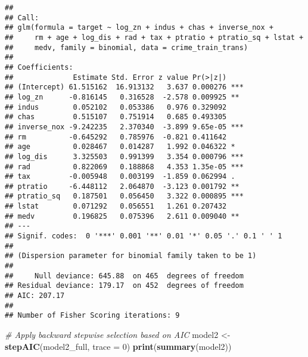 \documentclass[
]{article}
\newenvironment{Shaded}{\begin{snugshade}}{\end{snugshade}}
\newcommand{\AttributeTok}[1]{\textcolor[rgb]{0.13,0.29,0.53}{#1}}
\newcommand{\CommentTok}[1]{\textcolor[rgb]{0.56,0.35,0.01}{\textit{#1}}}
\newcommand{\DecValTok}[1]{\textcolor[rgb]{0.00,0.00,0.81}{#1}}
\newcommand{\FunctionTok}[1]{\textcolor[rgb]{0.13,0.29,0.53}{\textbf{#1}}}
\newcommand{\NormalTok}[1]{#1}
\newcommand{\OtherTok}[1]{\textcolor[rgb]{0.56,0.35,0.01}{#1}}
\begin{document}
\begin{verbatim}
## 
## Call:
## glm(formula = target ~ log_zn + indus + chas + inverse_nox + 
##     rm + age + log_dis + rad + tax + ptratio + ptratio_sq + lstat + 
##     medv, family = binomial, data = crime_train_trans)
## 
## Coefficients:
##              Estimate Std. Error z value Pr(>|z|)    
## (Intercept) 61.515162  16.913132   3.637 0.000276 ***
## log_zn      -0.816145   0.316528  -2.578 0.009925 ** 
## indus        0.052102   0.053386   0.976 0.329092    
## chas         0.515107   0.751914   0.685 0.493305    
## inverse_nox -9.242235   2.370340  -3.899 9.65e-05 ***
## rm          -0.645292   0.785976  -0.821 0.411642    
## age          0.028467   0.014287   1.992 0.046322 *  
## log_dis      3.325503   0.991399   3.354 0.000796 ***
## rad          0.822069   0.188868   4.353 1.35e-05 ***
## tax         -0.005948   0.003199  -1.859 0.062994 .  
## ptratio     -6.448112   2.064870  -3.123 0.001792 ** 
## ptratio_sq   0.187501   0.056450   3.322 0.000895 ***
## lstat        0.071292   0.056551   1.261 0.207432    
## medv         0.196825   0.075396   2.611 0.009040 ** 
## ---
## Signif. codes:  0 '***' 0.001 '**' 0.01 '*' 0.05 '.' 0.1 ' ' 1
## 
## (Dispersion parameter for binomial family taken to be 1)
## 
##     Null deviance: 645.88  on 465  degrees of freedom
## Residual deviance: 179.17  on 452  degrees of freedom
## AIC: 207.17
## 
## Number of Fisher Scoring iterations: 9
\end{verbatim}

\begin{Shaded}
\begin{Highlighting}[]
\CommentTok{\# Apply backward stepwise selection based on AIC}
\NormalTok{model2 }\OtherTok{\textless{}{-}} \FunctionTok{stepAIC}\NormalTok{(model2\_full, }\AttributeTok{trace =} \DecValTok{0}\NormalTok{)}
\FunctionTok{print}\NormalTok{(}\FunctionTok{summary}\NormalTok{(model2))}
\end{Highlighting}
\end{Shaded}
\end{document}
